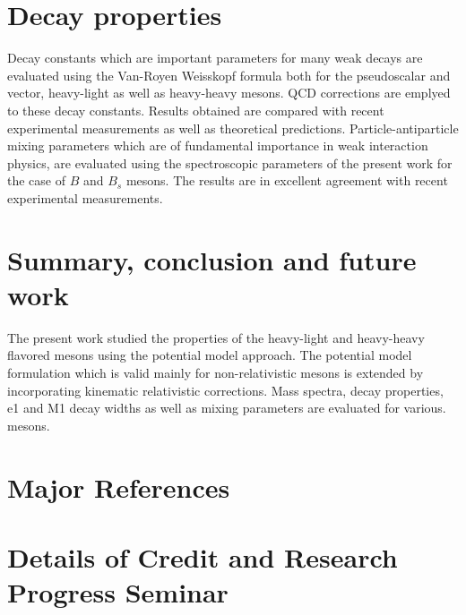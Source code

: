 \documentclass[draft,11pt]{scrreprt}
\begin{document}
\chapter{Decay properties}
Decay constants which are important parameters for many weak decays are evaluated using the Van-Royen Weisskopf formula both for the pseudoscalar and vector, heavy-light as well as heavy-heavy mesons. QCD corrections are emplyed to these decay constants. Results obtained are compared with recent experimental measurements as well as theoretical predictions. Particle-antiparticle mixing parameters which are of fundamental importance in weak interaction physics, are evaluated using the spectroscopic parameters of the present work for the case of $B$ and $B_s$  mesons. The results are in excellent agreement with recent experimental measurements.
\chapter{Summary, conclusion and future work}

The present work studied the properties of the heavy-light and heavy-heavy flavored mesons using the potential model approach. The potential model formulation which is valid mainly for non-relativistic mesons is extended by incorporating kinematic relativistic corrections. Mass spectra, decay properties, e1 and M1 decay widths as well as mixing parameters are evaluated for various. mesons.

\chapter*{Major References}


\newpage

\chapter*{Details of Credit and Research Progress Seminar}
\cite{devlani2012spectroscopy}
\cite{devlani2011p}
\cite{devlani2009spectra}
\cite{devlani2010spectrum}
\cite{rai2009decay}
\end{document}

